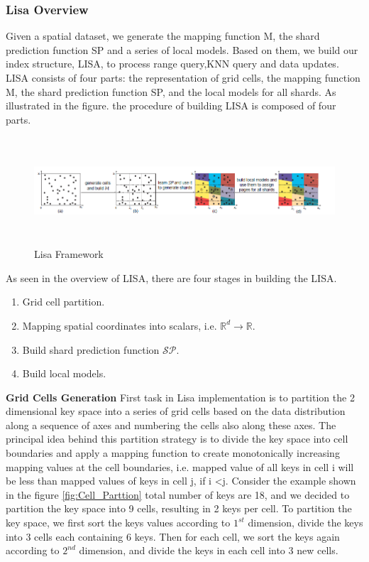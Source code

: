 \subsubsection{Lisa Overview}

Given a spatial dataset, we generate the mapping function
M, the shard prediction function SP and a series of local
models. Based on them, we build our index structure, LISA, to
process range query,KNN query and data updates. LISA consists of four parts: the representation of grid cells, the mapping function M, the shard prediction function SP, and the local models for all shards. As illustrated in the figure. the procedure of building LISA is composed of four parts.

\begin{figure}[t]
    \centering
    \includegraphics[width=17cm,height=4cm]{graphs/Lisa_Overview.png}
    \caption{Lisa Framework }
    \label{fig:Lisa_Framework}
\end{figure}

As seen in the overview of LISA, there are four stages in building the LISA. 
\begin{enumerate}
	\item Grid cell partition.
	\item Mapping spatial coordinates into scalars, i.e. $\mathbb{R}^d\to\mathbb{R}$.
	\item Build shard prediction function $\mathcal{SP}$.
	\item Build local models.
\end{enumerate}

\textbf{Grid Cells Generation} 
First task in Lisa implementation is to partition the 2 dimensional key space into a series of grid cells based on the data distribution along a sequence of axes and numbering the cells also along these axes. The principal idea behind this partition strategy is to divide the key space into cell boundaries and apply a mapping function to create monotonically increasing mapping values at the cell boundaries, i.e. mapped value of all keys in cell i will be less than mapped values of keys in cell j, if i <j. Consider the example shown in the figure \ref{fig:Cell_Parttion} total number of keys are 18, and we decided to partition the key space into 9 cells, resulting in 2 keys per cell. To partition the key space, we first sort the keys values according to $1^{st}$  dimension, divide the keys into 3 cells each containing 6 keys. Then for each cell, we sort the keys again according to $2^{nd}$  dimension, and divide the keys in each cell into 3 new cells. 


